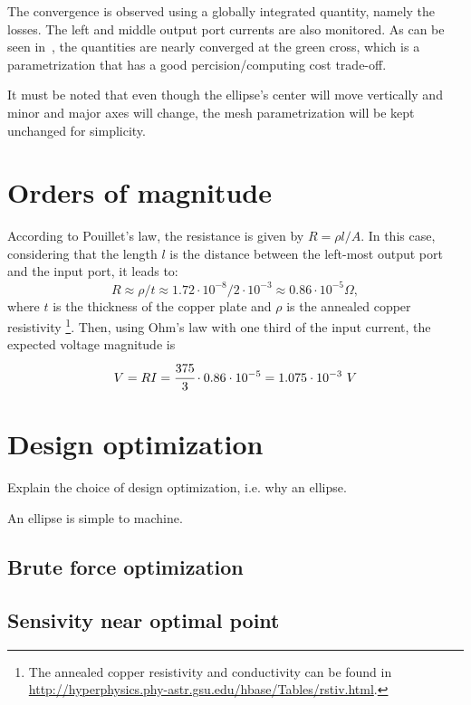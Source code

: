 \documentclass[]{article}
\begin{document}
The convergence is observed using a globally integrated quantity, namely the losses.
The left and middle output port currents are also monitored.
As can be seen in~, the quantities are nearly converged at the green cross,
which is a parametrization that has a good percision/computing cost trade-off.

It must be noted that even though the ellipse's center will move vertically and minor and major axes will change,
the mesh parametrization will be kept unchanged for simplicity.

\section{Orders of magnitude}


According to Pouillet's law, the resistance is given by $R = \rho l / A$.
In this case, considering that the length $l$ is the distance between the left-most output port
and the input port, it leads to:
%
\begin{equation}
    R \approx \rho /t \approx 1.72 \cdot 10^{-8} / 2 \cdot 10^{-3} \approx 0.86 \cdot 10^{-5} \Omega,
\end{equation}
%
where $t$ is the thickness of the copper plate and $\rho$ is the annealed copper resistivity
\footnote{The annealed copper resistivity and conductivity can be found in
\url{http://hyperphysics.phy-astr.gsu.edu/hbase/Tables/rstiv.html}.}.
Then, using Ohm's law with one third of the input current, the expected voltage magnitude is
%
\begin{equation}
    V = R I = \cfrac{375}{3} \cdot 0.86 \cdot 10^{-5} = 1.075 \cdot 10^{-3} \ V
\end{equation}
\section{Design optimization}

Explain the choice of design optimization, i.e. why an ellipse.

An ellipse is simple to machine.

\subsection{Brute force optimization}

\subsection{Sensivity near optimal point}
\end{document}
